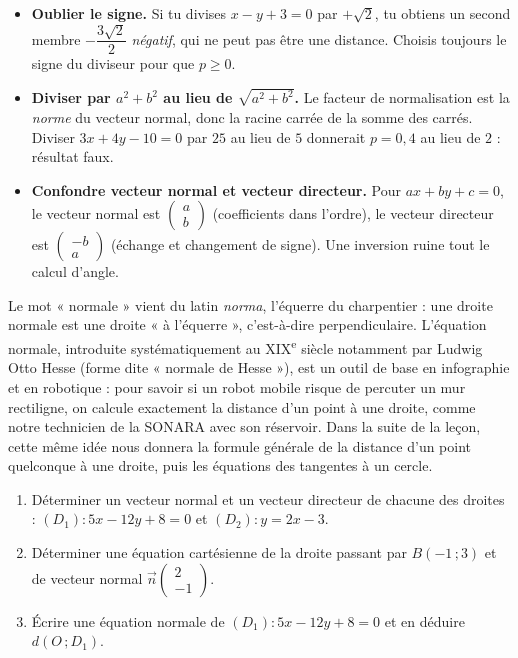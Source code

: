 \documentclass[11pt]{article}
\begin{document}
\begin{attention}
\begin{itemize}
\item \textbf{Oublier le signe.} Si tu divises $x - y + 3 = 0$ par $+\sqrt{2}$, tu obtiens un second membre $-\dfrac{3\sqrt{2}}{2}$ \emph{négatif}, qui ne peut pas être une distance. Choisis toujours le signe du diviseur pour que $p \geq 0$.
\item \textbf{Diviser par $a^2+b^2$ au lieu de $\sqrt{a^2+b^2}$.} Le facteur de normalisation est la \emph{norme} du vecteur normal, donc la racine carrée de la somme des carrés. Diviser $3x+4y-10=0$ par $25$ au lieu de $5$ donnerait $p = 0{,}4$ au lieu de $2$ : résultat faux.
\item \textbf{Confondre vecteur normal et vecteur directeur.} Pour $ax+by+c=0$, le vecteur normal est $\begin{pmatrix} a \\ b \end{pmatrix}$ (coefficients dans l'ordre), le vecteur directeur est $\begin{pmatrix} -b \\ a \end{pmatrix}$ (échange et changement de signe). Une inversion ruine tout le calcul d'angle.
\end{itemize}
\end{attention}

\begin{savaistu}
Le mot « normale » vient du latin \emph{norma}, l'équerre du charpentier : une droite normale est une droite « à l'équerre », c'est-à-dire perpendiculaire. L'équation normale, introduite systématiquement au XIX\textsuperscript{e} siècle notamment par Ludwig Otto Hesse (forme dite « normale de Hesse »), est un outil de base en infographie et en robotique : pour savoir si un robot mobile risque de percuter un mur rectiligne, on calcule exactement la distance d'un point à une droite, comme notre technicien de la SONARA avec son réservoir. Dans la suite de la leçon, cette même idée nous donnera la formule générale de la distance d'un point quelconque à une droite, puis les équations des tangentes à un cercle.
\end{savaistu}

\begin{exercice}
\begin{enumerate}
\item Déterminer un vecteur normal et un vecteur directeur de chacune des droites : $(D_1) : 5x - 12y + 8 = 0$ et $(D_2) : y = 2x - 3$.
\item Déterminer une équation cartésienne de la droite passant par $B(-1\,;3)$ et de vecteur normal $\vec{n}\begin{pmatrix} 2 \\ -1 \end{pmatrix}$.
\item Écrire une équation normale de $(D_1) : 5x - 12y + 8 = 0$ et en déduire $d(O\,;D_1)$.
\end{enumerate}
\end{exercice}
\end{document}
